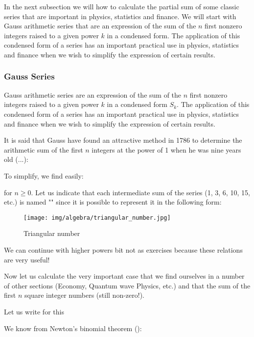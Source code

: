 	In the next subsection we will how to calculate the partial sum of some classic series that are important in physics, statistics and finance. We will start with Gauss arithmetic series that are an expression of the sum of the $n$ first nonzero integers raised to a given power $k$ in a condensed form. The application of this condensed form of a series has an important practical use in physics, statistics and finance when we wish to simplify the expression of certain results.
	
	\subsubsection{Gauss Series}\label{gauss series}
	
	Gauss arithmetic series are an expression of the sum of the $n$ first nonzero integers raised to a given power $k$ in a condensed form $S_k$. The application of this condensed form of a series has an important practical use in physics, statistics and finance when we wish to simplify the expression of certain results.
	
	It is said that Gauss have found an attractive method in 1786 to determine the arithmetic sum of the first $n$ integers at the power of 1 when he was nine years old (...):
	
	To simplify, we find easily:
	
	for $n \geq 0$. Let us indicate that each intermediate sum of the series (1, 3, 6, 10, 15, etc.) is named "" since it is possible to represent it in the following form:

	\begin{figure}[H]
		\centering
		\texttt{[image: img/algebra/triangular\_number.jpg]}
		\caption{Triangular number}
	\end{figure}

	We can continue with higher powers bit not as exercises because these relations are very useful!

	Now let us calculate the very important case that we find ourselves in a number of other sections (Economy, Quantum wave Physics, etc.) and that  the sum of the first $n$ square integer numbers (still non-zero!).

	Let us write for this\label{sum of squares integers}
	
	We know from Newton's binomial theorem ():
	

